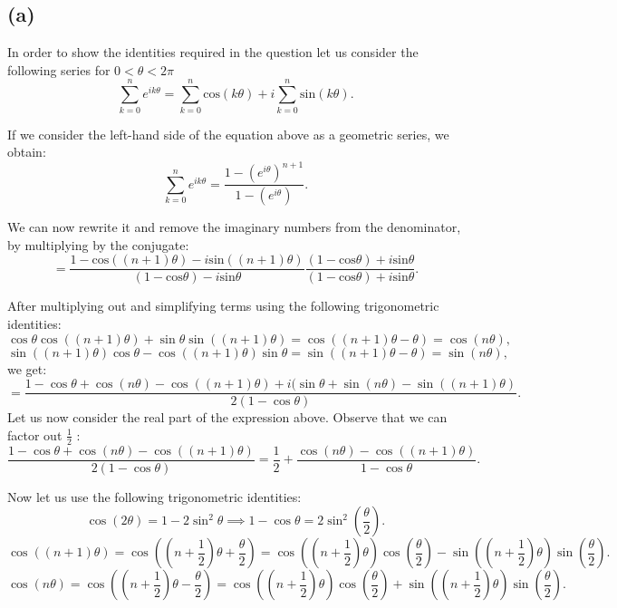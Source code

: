 \documentclass[12pt]{article}
\begin{document}
\subsection*{(a)}
In order to show the identities required in the question let us consider the following series for $0 < \theta < 2\pi$
\begin{equation}
	 \sum^{n}_{k = 0} e^{ik\theta} = \sum^{n}_{k = 0} \text{cos}(k\theta) + i\sum^{n}_{k = 0} \text{sin}(k\theta)
 .\end{equation}

If we consider the left-hand side of the equation above as a geometric series, we obtain:
\[
	\sum^{n}_{k = 0} e^{ik\theta} = \frac{1 - (e^{i\theta})^{n+1}}{1 - (e^{i\theta})} 
.\]

We can now rewrite it and remove the imaginary numbers from the denominator, by multiplying by the conjugate:
\[
	= \frac{1 - \text{cos}((n+1)\theta) - i\text{sin}((n+1)\theta)}{(1 - \text{cos}\theta) - i\text{sin}\theta} 
	\frac{(1 - \text{cos}\theta) + i\text{sin}\theta}{(1 - \text{cos}\theta) + i\text{sin}\theta}
.\]

After multiplying out and simplifying terms using the following trigonometric identities: 
\[
	\cos\theta\cos((n+1)\theta) + \sin\theta\sin((n+1)\theta) = \cos((n+1)\theta - \theta) = \cos(n\theta)
,\]
\[
	\sin((n+1)\theta)\cos\theta - \cos((n+1)\theta)\sin\theta   = \sin((n+1)\theta - \theta) = \sin(n\theta)
,\]
we get:
\begin{equation}
	= \frac{1 - \cos\theta + \cos(n\theta) - \cos((n+1)\theta)  + i(\sin\theta + \sin(n\theta) - \sin((n+1)\theta)}{2(1 - \cos\theta)}
.\end{equation}
Let us now consider the real part of the expression above. Observe that we can factor out $\frac{1}{2}$ :
\begin{equation}
	\frac{1 - \cos\theta + \cos(n\theta) - \cos((n+1)\theta)}{2(1 - \cos\theta)} = \frac{1}{2} + \frac{\cos(n\theta) - \cos((n+1)\theta)}{1 - \cos\theta}  
.\end{equation}

Now let us use the following trigonometric identities:
\[
	\cos(2\theta) = 1 - 2\sin^2\theta \implies 1 - \cos\theta = 2 \sin^2\left(\frac{\theta}{2}\right) 
.\]
\[
	\cos((n+1)\theta) = \cos(\left(n+\frac{1}{2}\right)\theta + \frac{\theta}{2}) = 
	\cos(\left(n+\frac{1}{2}\right)\theta) \cos(\frac{\theta}{2}) - \sin(\left(n+\frac{1}{2}\right)\theta) \sin(\frac{\theta}{2})  
.\]
\[
	\cos(n\theta) = \cos(\left(n+\frac{1}{2}\right)\theta - \frac{\theta}{2}) = 
	\cos(\left(n+\frac{1}{2}\right)\theta) \cos(\frac{\theta}{2}) + \sin(\left(n+\frac{1}{2}\right)\theta) \sin(\frac{\theta}{2})  
.\]
\end{document}
